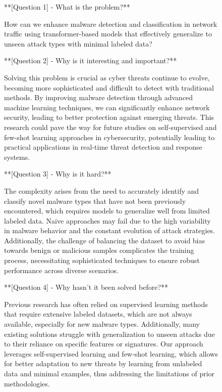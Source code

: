 \begin{figure}[htbp]
\centering
\begin{tcolorbox}[colback=green!2!white, colframe=gray!50!green]
\begin{minipage}{\linewidth}
\small
**[Question 1] - What is the problem?**

How can we enhance malware detection and classification in network traffic using transformer-based models that effectively generalize to unseen attack types with minimal labeled data?

**[Question 2] - Why is it interesting and important?**

Solving this problem is crucial as cyber threats continue to evolve, becoming more sophisticated and difficult to detect with traditional methods. By improving malware detection through advanced machine learning techniques, we can significantly enhance network security, leading to better protection against emerging threats. This research could pave the way for future studies on self-supervised and few-shot learning approaches in cybersecurity, potentially leading to practical applications in real-time threat detection and response systems.

**[Question 3] - Why is it hard?**

The complexity arises from the need to accurately identify and classify novel malware types that have not been previously encountered, which requires models to generalize well from limited labeled data. Naive approaches may fail due to the high variability in malware behavior and the constant evolution of attack strategies. Additionally, the challenge of balancing the dataset to avoid bias towards benign or malicious samples complicates the training process, necessitating sophisticated techniques to ensure robust performance across diverse scenarios.

**[Question 4] - Why hasn't it been solved before?**

Previous research has often relied on supervised learning methods that require extensive labeled datasets, which are not always available, especially for new malware types. Additionally, many existing solutions struggle with generalization to unseen attacks due to their reliance on specific features or signatures. Our approach leverages self-supervised learning and few-shot learning, which allows for better adaptation to new threats by learning from unlabeled data and minimal examples, thus addressing the limitations of prior methodologies.


\end{minipage}
\end{tcolorbox}
\end{figure}
